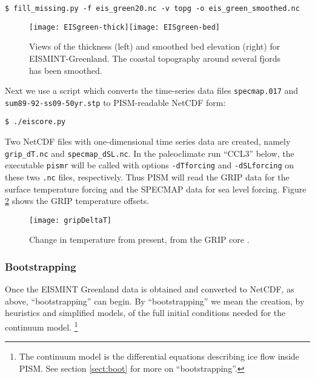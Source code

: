\begin{verbatim}
$ fill_missing.py -f eis_green20.nc -v topg -o eis_green_smoothed.nc
\end{verbatim}%

\begin{figure}[ht]
\centering
\texttt{[image: EISgreen-thick]}\quad\texttt{[image: EISgreen-bed]}
\caption{Views of the thickness (left) and smoothed bed elevation (right) for EISMINT-Greenland.  The coastal topography around several fjords has been smoothed.}
\label{fig:greendata}
\end{figure}

Next we use a script which converts the time-series data files \texttt{specmap.017} and \texttt{sum89-92-ss09-50yr.stp} to PISM-readable NetCDF form:

\begin{verbatim}
$ ./eiscore.py
\end{verbatim}%

\noindent Two NetCDF files with one-dimensional time series data are created, namely \texttt{grip_dT.nc} and \texttt{specmap_dSL.nc}.  In the paleoclimate run ``CCL3'' below, the executable \texttt{pismr} will be called with options \texttt{-dTforcing} and \texttt{-dSLforcing} on these two \texttt{.nc} files, respectively.  Thus PISM will read the GRIP data \cite{Dansgaardetal1993} for the surface temperature forcing and the SPECMAP data \cite{Imbrieetal1984} for sea level forcing.  Figure \ref{fig:gripDeltaT} shows the GRIP temperature offsets.

\begin{figure}[ht]
\centering
\texttt{[image: gripDeltaT]}
\caption{Change in temperature from present, from the GRIP core \cite{JohnsenetalGRIP}.}
\label{fig:gripDeltaT}
\end{figure}


\subsubsection*{Bootstrapping}  \label{sect:green-bootstrapping}  Once the EISMINT Greenland data is obtained and converted to NetCDF, as above, ``bootstrapping'' can begin.  By ``bootstrapping'' we mean the creation, by heuristics and simplified models, of the full initial conditions needed for the continuum model.  \footnote{The continuum model is the differential equations describing ice flow inside PISM.  See section \ref{sect:boot} for more on ``bootstrapping''.}

